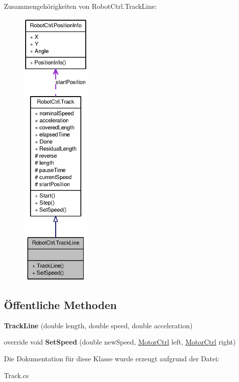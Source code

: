 Zusammengehörigkeiten von RobotCtrl.TrackLine:\nopagebreak
\begin{figure}[H]
\begin{center}
\leavevmode
\includegraphics[height=400pt]{class_robot_ctrl_1_1_track_line__coll__graph}
\end{center}
\end{figure}
\subsection*{Öffentliche Methoden}
\begin{DoxyCompactItemize}
\item 
\hypertarget{class_robot_ctrl_1_1_track_line_ab4ab93433f36792a4748322b94febfc7}{
{\bfseries TrackLine} (double length, double speed, double acceleration)}
\label{class_robot_ctrl_1_1_track_line_ab4ab93433f36792a4748322b94febfc7}

\item 
\hypertarget{class_robot_ctrl_1_1_track_line_ad73ae0e8f7aea1765834ab90f5bd6b23}{
override void {\bfseries SetSpeed} (double newSpeed, \hyperlink{class_robot_ctrl_1_1_motor_ctrl}{MotorCtrl} left, \hyperlink{class_robot_ctrl_1_1_motor_ctrl}{MotorCtrl} right)}
\label{class_robot_ctrl_1_1_track_line_ad73ae0e8f7aea1765834ab90f5bd6b23}

\end{DoxyCompactItemize}


Die Dokumentation für diese Klasse wurde erzeugt aufgrund der Datei:\begin{DoxyCompactItemize}
\item 
Track.cs\end{DoxyCompactItemize}
